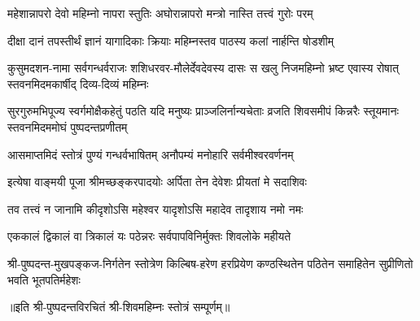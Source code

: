 \twolineshloka
{महेशान्नापरो देवो महिम्नो नापरा स्तुतिः}
{अघोरान्नापरो मन्त्रो नास्ति तत्त्वं गुरोः परम्}%

\twolineshloka
{दीक्षा दानं तपस्तीर्थं ज्ञानं यागादिकाः क्रियाः}
{महिम्नस्तव पाठस्य कलां नार्हन्ति षोडशीम्}%

\fourlineindentedshloka
{कुसुमदशन-नामा सर्वगन्धर्वराजः}
{शशिधरवर-मौलेर्देवदेवस्य दासः}
{स खलु निजमहिम्नो भ्रष्ट एवास्य रोषात्}
{स्तवनमिदमकार्षीद् दिव्य-दिव्यं महिम्नः}%

\fourlineindentedshloka
{सुरगुरुमभिपूज्य स्वर्गमोक्षैकहेतुं}
{पठति यदि मनुष्यः प्राञ्जलिर्नान्यचेताः}
{व्रजति शिवसमीपं किन्नरैः स्तूयमानः}
{स्तवनमिदममोघं पुष्पदन्तप्रणीतम्}%

\twolineshloka
{आसमाप्तमिदं स्तोत्रं पुण्यं गन्धर्वभाषितम्}
{अनौपम्यं मनोहारि सर्वमीश्वरवर्णनम्}%

\twolineshloka
{इत्येषा वाङ्मयी पूजा श्रीमच्छङ्करपादयोः}
{अर्पिता तेन देवेशः प्रीयतां मे सदाशिवः}%

\twolineshloka
{तव तत्त्वं न जानामि कीदृशोऽसि महेश्वर}
{यादृशोऽसि महादेव तादृशाय नमो नमः}%

\twolineshloka
{एककालं द्विकालं वा त्रिकालं यः पठेन्नरः}
{सर्वपापविनिर्मुक्तः शिवलोके महीयते}%

\fourlineindentedshloka
{श्री-पुष्पदन्त-मुखपङ्कज-निर्गतेन}
{स्तोत्रेण किल्बिष-हरेण हरप्रियेण}
{कण्ठस्थितेन पठितेन समाहितेन}
{सुप्रीणितो भवति भूतपतिर्महेशः}%

॥इति श्री-पुष्पदन्तविरचितं श्री-शिवमहिम्नः स्तोत्रं सम्पूर्णम्॥